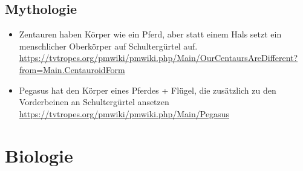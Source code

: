 \section{Mythologie}

\begin{itemize}
 \item Zentauren haben Körper wie ein Pferd, aber statt einem Hals setzt ein menschlicher Oberkörper auf Schultergürtel auf.\\
 \url{https://tvtropes.org/pmwiki/pmwiki.php/Main/OurCentaursAreDifferent?from=Main.CentauroidForm}
 \item Pegasus hat den Körper eines Pferdes + Flügel, die zusätzlich zu den Vorderbeinen an Schultergürtel ansetzen\\
 \url{https://tvtropes.org/pmwiki/pmwiki.php/Main/Pegasus}
\end{itemize}





\chapter{Biologie}

